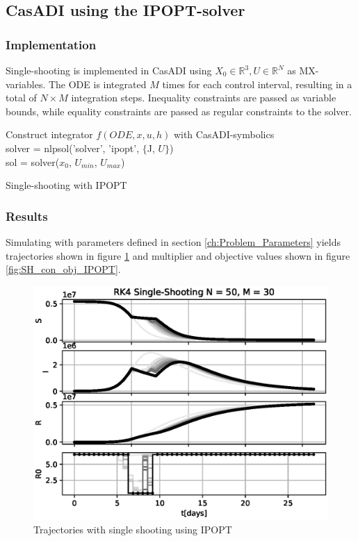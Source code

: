 \subsection{CasADI using the IPOPT-solver}
\subsubsection{Implementation}
Single-shooting is implemented in CasADI using $X_0 \in \mathbb{R}^3, U \in \mathbb{R}^{N}$ as MX-variables. The ODE is integrated $M$ times for each control interval, resulting in a total of $N\times M$ integration steps. Inequality constraints are passed as variable bounds, while equality constraints are passed as regular constraints to the solver.

\begin{algorithm}[H]
\SetAlgoLined
{}
Construct integrator $f(ODE, x, u, h)$ with CasADI-symbolics\\
 solver = nlpsol('solver', 'ipopt', $\{$J, $U\}$)\\
 sol = solver($x_0$, $U_{min}$, $U_{max}$)
 \caption{Single-shooting with IPOPT}
 \label{alg:SingleShooting_Integration_IPOPT}
\end{algorithm}
\subsubsection{Results}
Simulating with parameters defined in section \ref{ch:Problem_Parameters} yields trajectories shown in figure \ref{fig:SH_Traj_IPOPT} and multiplier and objective values shown in figure \ref{fig:SH_con_obj_IPOPT}.

\begin{figure}[H]
    \centering
    \includegraphics[width=.8\textwidth]{pythonProject/Figures/Single_Shooting_Trajectory_IPOPT.eps}
    \caption{Trajectories with single shooting using IPOPT}
    \label{fig:SH_Traj_IPOPT}
\end{figure}

